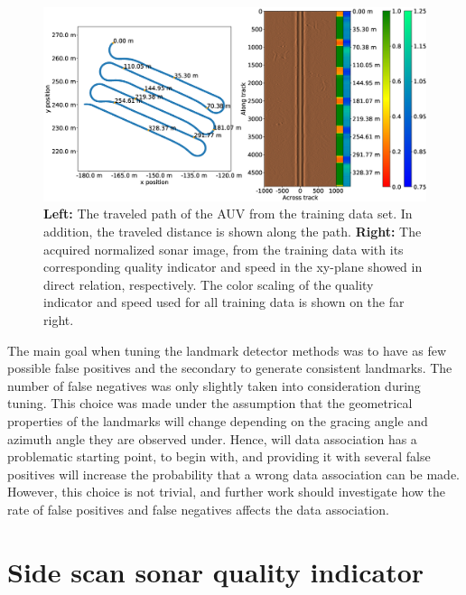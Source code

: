 \begin{figure}
    \centering
    \includegraphics[trim=0cm 2cm 0cm 3cm, clip=true, width=1.0\textwidth]{figures/path_sonar_colorbars_training.eps}
    \caption{\textbf{Left:} The traveled path of the AUV from the training data set. In addition, the traveled distance is shown along the path. \textbf{Right:} The acquired normalized sonar image, from the training data with its corresponding quality indicator and speed in the xy-plane showed in direct relation, respectively. The color scaling of the quality indicator and speed used for all training data is shown on the far right.}
    \label{fig:path_sonar_colorbars}
\end{figure}

The main goal when tuning the landmark detector methods was to have as few possible false positives and the secondary to generate consistent landmarks. The number of false negatives was only slightly taken into consideration during tuning. This choice was made under the assumption that the geometrical properties of the landmarks will change depending on the gracing angle and azimuth angle they are observed under. Hence, will data association has a problematic starting point, to begin with, and providing it with several false positives will increase the probability that a wrong data association can be made. However, this choice is not trivial, and further work should investigate how the rate of false positives and false negatives affects the data association.

\section{Side scan sonar quality indicator}


